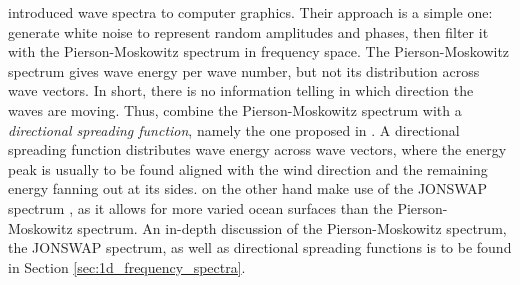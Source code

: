 %
\cite{Mastin:1987} introduced wave spectra to computer graphics. Their approach
is a simple one: generate white noise to represent random amplitudes and phases,
then filter it with the Pierson-Moskowitz spectrum
\citep{article:PiersonMoskowitz1964} in frequency space. The Pierson-Moskowitz
spectrum gives wave energy per wave number, but not its distribution across
wave vectors. In short, there is no information telling in which direction the
waves are moving. Thus, \citeauthor{Mastin:1987} combine the Pierson-Moskowitz
spectrum with a \emph{directional spreading function}, namely the one proposed
in \cite{article:Hasselmann1980}. A directional
spreading function distributes wave energy across wave vectors, where
the energy peak is usually to be found aligned with the wind direction and the
remaining energy fanning out at its sides.
\cite{Premoze:2000} on the other hand make use of the JONSWAP spectrum
\citep{article:Hasselman1973}, as it allows for more varied ocean surfaces than
the Pierson-Moskowitz spectrum.
An in-depth discussion of the Pierson-Moskowitz spectrum, the JONSWAP spectrum,
as well as directional spreading functions is to be found in Section
\ref{sec:1d_frequency_spectra}.

